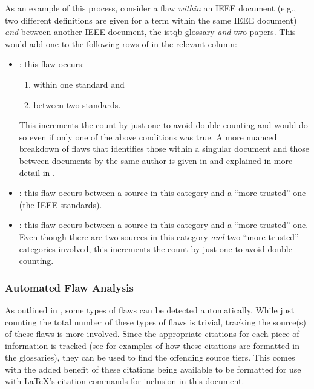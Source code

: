 \label{flaw-analysis-example}
As an example of this process, consider a flaw \emph{within} an IEEE
document (e.g., two different definitions are given for a term within the same
IEEE document) \emph{and} between another IEEE document, the \acs{istqb}
glossary \emph{and} two papers. This would add one to the following rows of
 in the relevant column:

\begin{itemize}
    \item \textbf{\stds{}}: this flaw occurs:
          \begin{enumerate}
              \item within one standard and
              \item between two standards.
          \end{enumerate}
          This increments the count by just one to avoid double counting and
          would do so even if only one of the above conditions was true. A more
          nuanced breakdown of flaws that identifies those within a
          singular document and those between documents by the same author is
          given in  and explained in more detail in
          .
    \item \textbf{\metas{}}: this flaw occurs between a
          source in this category and a ``more trusted'' one
          (the IEEE standards).
    \item \textbf{\papers{}}: this flaw occurs between a
          source in this category and a ``more trusted'' one. Even though there
          are two sources in this category \emph{and} two ``more trusted''
          categories involved, this increments the count by just one to avoid
          double counting.
\end{itemize}

\subsubsection{Automated Flaw Analysis}
\label{auto-flaw-analysis}

As outlined in , some types of flaws can be detected
automatically. While just counting the total number of these types of
flaws is trivial, tracking the source(s) of these flaws is more
involved. Since the appropriate citations for each piece of information is
tracked (see  for examples of
how these citations are formatted in the glossaries), they can be used to find
the offending source tiers. This comes with the added benefit of these
citations being available to be formatted for use with \LaTeX{}'s citation
commands for inclusion in this document.

